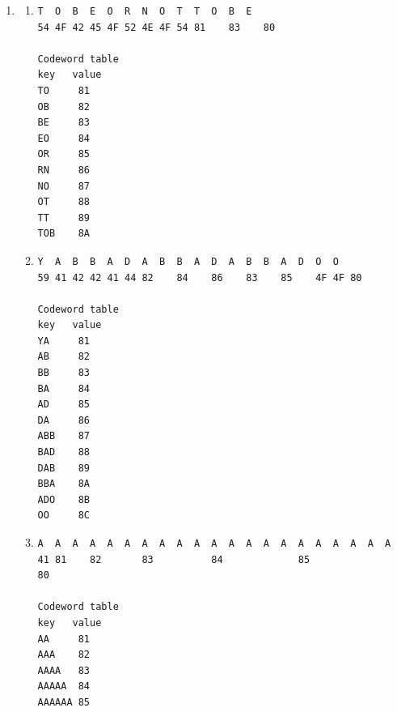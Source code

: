 \documentclass[11pt,fleqn]{article}
\begin{document}
\begin{enumerate}
	\item 
\begin{enumerate}
\item \begin{Verbatim}
T  O  B  E  O  R  N  O  T  T  O  B  E
54 4F 42 45 4F 52 4E 4F 54 81    83    80

Codeword table
key   value
TO     81
OB     82
BE     83
EO     84
OR     85
RN     86
NO     87
OT     88
TT     89
TOB    8A
\end{Verbatim}

\item \begin{Verbatim}
Y  A  B  B  A  D  A  B  B  A  D  A  B  B  A  D  O  O
59 41 42 42 41 44 82    84    86    83    85    4F 4F 80

Codeword table
key   value
YA     81
AB     82
BB     83
BA     84
AD     85
DA     86
ABB    87
BAD    88
DAB    89
BBA    8A
ADO    8B
OO     8C
\end{Verbatim}

\item \begin{Verbatim}
A  A  A  A  A  A  A  A  A  A  A  A  A  A  A  A  A  A  A  A  A
41 81    82       83          84             85                80

Codeword table
key   value
AA     81
AAA    82
AAAA   83
AAAAA  84
AAAAAA 85
\end{Verbatim}
\end{enumerate}

\end{enumerate}
\end{document}
